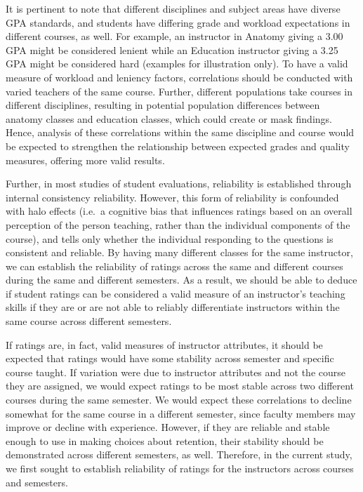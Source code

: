 \documentclass[,man]{apa6}
\theoremstyle{definition}
\theoremstyle{definition}
\theoremstyle{definition}
\theoremstyle{remark}
\begin{document}
It is pertinent to note that different disciplines and subject areas
have diverse GPA standards, and students have differing grade and
workload expectations in different courses, as well. For example, an
instructor in Anatomy giving a 3.00 GPA might be considered lenient
while an Education instructor giving a 3.25 GPA might be considered hard
(examples for illustration only). To have a valid measure of workload
and leniency factors, correlations should be conducted with varied
teachers of the same course. Further, different populations take courses
in different disciplines, resulting in potential population differences
between anatomy classes and education classes, which could create or
mask findings. Hence, analysis of these correlations within the same
discipline and course would be expected to strengthen the relationship
between expected grades and quality measures, offering more valid
results.

Further, in most studies of student evaluations, reliability is
established through internal consistency reliability. However, this form
of reliability is confounded with halo effects (i.e.~a cognitive bias
that influences ratings based on an overall perception of the person
teaching, rather than the individual components of the course), and
tells only whether the individual responding to the questions is
consistent and reliable. By having many different classes for the same
instructor, we can establish the reliability of ratings across the same
and different courses during the same and different semesters. As a
result, we should be able to deduce if student ratings can be considered
a valid measure of an instructor's teaching skills if they are or are
not able to reliably differentiate instructors within the same course
across different semesters.

If ratings are, in fact, valid measures of instructor attributes, it
should be expected that ratings would have some stability across
semester and specific course taught. If variation were due to instructor
attributes and not the course they are assigned, we would expect ratings
to be most stable across two different courses during the same semester.
We would expect these correlations to decline somewhat for the same
course in a different semester, since faculty members may improve or
decline with experience. However, if they are reliable and stable enough
to use in making choices about retention, their stability should be
demonstrated across different semesters, as well. Therefore, in the
current study, we first sought to establish reliability of ratings for
the instructors across courses and semesters.
\end{document}
